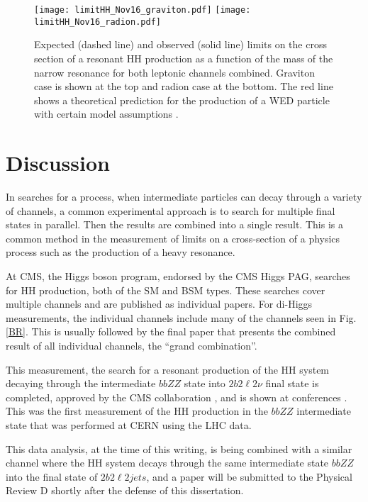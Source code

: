 \begin{figure}[H] 
\begin{center}
\texttt{[image: limitHH\_Nov16\_graviton.pdf]}
\texttt{[image: limitHH\_Nov16\_radion.pdf]}
\caption{ Expected (dashed line) and observed (solid line) limits on the cross section of a resonant HH production
as a function of the mass of the narrow resonance for both leptonic channels combined. Graviton case is shown at the top and radion case at the bottom. The red line shows a theoretical prediction for
the production of a WED particle with certain model assumptions \cite{Oliveira:2014kla}.}
\label{fig:HHlimits} 
\end{center}
\end{figure}

\section{Discussion}
\label{sec:Discussion}

In searches for a process, when intermediate particles can decay through a variety of channels, a common experimental approach is to search for multiple final states in parallel. Then the results are combined into a single result. This is a common method in the measurement of limits on a cross-section of a physics process such as the production of a heavy resonance.

At CMS, the Higgs boson program, endorsed by the CMS Higgs PAG, searches for HH production, both of the SM and BSM types. These searches cover multiple channels and are published as individual papers. For di-Higgs measurements, the individual channels include many of the channels seen in Fig. \ref{BR}. This is usually followed by the final paper that presents the combined result of all individual channels, the ``grand combination''.

This measurement, the search for a resonant production of the HH system decaying through the intermediate $bbZZ$ state into $2 b 2 \ell 2 \nu$ final state is completed, approved by the CMS collaboration \cite{CMS-PAS-HIG-17-032}, and is shown at conferences \cite{HiggsCouplings2018}. This was the first measurement of the HH production in the $bbZZ$ intermediate state that was performed at CERN using the LHC data. 

This data analysis, at the time of this writing, is being combined with a similar channel where the HH system decays through the same intermediate state $bbZZ$ into the final state of $2 b 2 \ell 2 jets$, and a paper will be submitted to the Physical Review D shortly after the defense of this dissertation.

